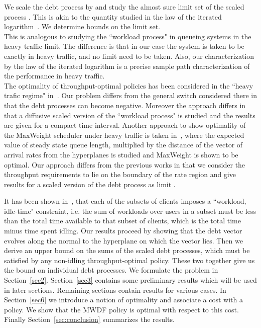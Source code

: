 \documentclass[letterpaper, 10 pt, conference]{ieeeconf}
\begin{document}
We scale the debt process by  and study the almost sure limit set of the scaled process . This is akin to the quantity studied in the law of the iterated logarithm~\cite{c5}. We determine bounds on the limit set.  \\
This is analogous to studying the ``workload process" in queueing systems in the heavy traffic limit. The difference is that in our case the system is taken to be exactly in heavy traffic, and no limit need to be taken. Also, our characterization by the law of the iterated logarithm is a precise sample path characterization of the performance in heavy traffic.\\
The optimality of throughput-optimal policies has been considered in the ``heavy trafic regime" in~\cite{c1,c2}. Our problem differs from the general switch considered there in that the debt processes can become negative. Moreover the approach differs in that a diffusive scaled version of the ``workload process" is studied and the results are given for a compact time interval. Another approach to show optimality of the MaxWeight scheduler under heavy traffic is taken in~\cite{c2}, where the expected value of steady state queue length, multiplied by the distance of the vector of arrival rates from the hyperplanes is studied and MaxWeight is shown to be optimal. Our approach differs from the previous works in that we consider the throughput requirements to lie on the boundary of the rate region and give results for a scaled version of the debt process  as limit .

It has been shown in~\cite{c3}, that each of the  subsets of clients imposes a ``workload, idle-time" constraint, i.e. the sum of workloads over users in a subset must be less than the total time available to that subset of clients, which is the total time minus time spent idling. 
 Our results proceed by showing that the debt vector evolves along the normal to the hyperplane on which the  vector lies. Then we derive an upper bound on the sums of the scaled debt processes, which must be satisfied by any non-idling throughput-optimal policy. These two together give us the bound on individual debt processes.
We formulate the problem in Section~\ref{sec2}. Section~\ref{sec3} contains some preliminary results which will be used in later sections. Remaining sections contain results for various cases. In Section~\ref{sec6} we introduce a notion of optimality and associate a cost with a policy. We show that the MWDF policy is optimal with respect to this cost. Finally Section~\ref{sec:conclusion} summarizes the results. 
\end{document}

